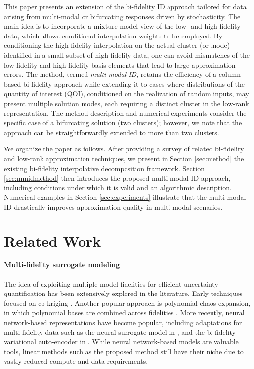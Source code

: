 \documentclass[preprint,10pt]{elsarticle}
\begin{document}
This paper presents an extension of the bi-fidelity ID approach tailored for data arising from multi-modal or bifurcating responses driven by stochasticity. The main idea is to incorporate a mixture-model view of the low- and high-fidelity data, which allows conditional interpolation weights to be employed. By conditioning the high-fidelity interpolation on the actual cluster (or mode) identified in a small subset of high-fidelity data, one can avoid mismatches of the low-fidelity and high-fidelity basis elements that lead to large approximation errors. The method, termed \emph{multi-modal ID}, retains the efficiency of a column-based bi-fidelity approach while extending it to cases where distributions of the quantity of interest (QOI), conditioned on the realization of random inputs, may present multiple solution modes, each requiring a distinct cluster in the low-rank representation. The method description and numerical experiments consider the specific case of a bifurcating solution (two clusters); however, we note that the approach can be straightforwardly extended to more than two clusters.

We organize the paper as follows. After providing a survey of related bi-fidelity and low-rank approximation techniques, we present in Section \ref{sec:method} the existing bi-fidelity interpolative decomposition framework. Section \ref{sec:mmidmethod} then introduces the proposed multi-modal ID approach, including conditions under which it is valid and an algorithmic description. Numerical examples in Section \ref{sec:experiments} illustrate that the multi-modal ID drastically improves approximation quality in multi-modal scenarios.



\section{Related Work}
\label{sec:related-work}

\paragraph{Multi-fidelity surrogate modeling} 

The idea of exploiting multiple model fidelities for efficient uncertainty quantification has been extensively explored in the literature. Early techniques focused on co-kriging \cite{kennedy2000predicting,le2014recursive, le2013multi}. Another popular approach is polynomial chaos expansion, in which polynomial bases are combined across fidelities \cite{ng2012multifidelity,palar2016multi,newberry2022bi}.
More recently, neural network-based representations have become popular, including adaptations for multi-fidelity data such as the neural surrogate model in \cite{meng2020composite,de2020transfer,motamed2020multi,de2022neural}, and the bi-fidelity variational auto-encoder in \cite{cheng2024bi}. While neural network-based models are valuable tools, linear methods such as the proposed method still have their niche due to vastly reduced compute and data requirements.
\end{document}
